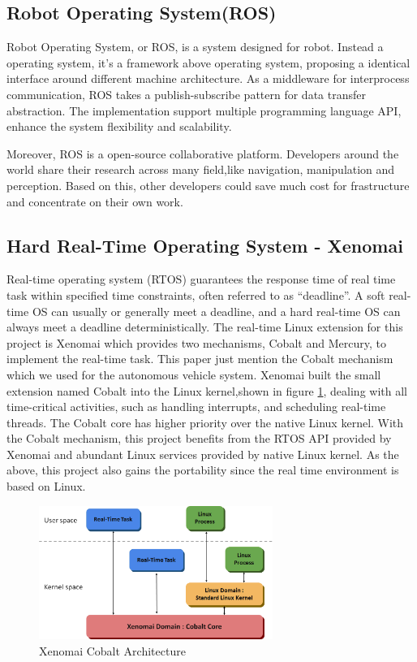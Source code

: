 \documentclass[conference]{IEEEtran}
\begin{document}
\subsection{Robot Operating System(ROS)}

Robot Operating System, or ROS, is a system designed for robot. Instead a operating system, it’s a framework above operating system, proposing a identical interface around different machine architecture. As a middleware for interprocess communication, ROS takes a publish-subscribe pattern for data transfer abstraction. The implementation support multiple programming language API, enhance the system flexibility and scalability.

Moreover, ROS is a open-source collaborative platform. Developers around the world share their research across many field,like navigation, manipulation and perception. Based on this, other developers could save much cost for frastructure and concentrate on their own work.

\subsection{Hard Real-Time Operating System - Xenomai}

Real-time operating system (RTOS) guarantees the response time of real time task within specified time constraints, often referred to as “deadline”. A soft real-time OS can usually or generally meet a deadline, and a hard real-time OS can always meet a deadline deterministically. The real-time Linux extension for this project is Xenomai which provides two mechanisms, Cobalt and Mercury, to implement the real-time task. This paper just mention the Cobalt mechanism which we used for the autonomous vehicle system. Xenomai built the small extension named Cobalt into the Linux kernel,shown in figure \ref{fig:xeno_arch}, dealing with all time-critical activities, such as handling interrupts, and scheduling real-time threads. The Cobalt core has higher priority over the native Linux kernel. With the Cobalt mechanism, this project benefits from the RTOS API provided by Xenomai and abundant Linux services provided by native Linux kernel. As the above, this project also gains the portability since the real time environment is based on Linux.

\begin{figure}
	\centering
	\includegraphics[width=3in]{img/xeno_arch.png}
	\caption{Xenomai Cobalt Architecture}
	\label{fig:xeno_arch}
\end{figure}
\FloatBarrier
\end{document}
